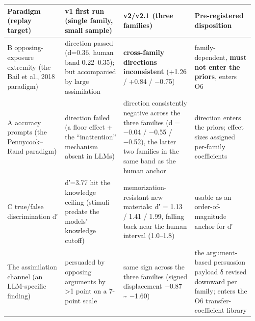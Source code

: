 \documentclass[
  11pt]{article}
\begin{document}
\begin{longtable}[]{@{}
  >{\raggedright\arraybackslash}p{}
  >{\raggedright\arraybackslash}p{}
  >{\raggedright\arraybackslash}p{}
  >{\raggedright\arraybackslash}p{}@{}}
\toprule\noalign{}
\begin{minipage}[b]{\linewidth}\raggedright
Paradigm (replay target)
\end{minipage} & \begin{minipage}[b]{\linewidth}\raggedright
v1 first run (single family, small sample)
\end{minipage} & \begin{minipage}[b]{\linewidth}\raggedright
v2/v2.1 (three families)
\end{minipage} & \begin{minipage}[b]{\linewidth}\raggedright
Pre-registered disposition
\end{minipage} \\
\midrule\noalign{}
\endhead
\bottomrule\noalign{}
\endlastfoot
B opposing-exposure extremity (the Bail et al., 2018 paradigm) &
direction passed (d=0.36, human band 0.22--0.35); but accompanied by
large assimilation & \textbf{cross-family directions inconsistent}
(+1.26 / +0.84 / −0.75) & family-dependent, \textbf{must not enter the
priors}, enters O6 \\
A accuracy prompts (the Pennycook--Rand paradigm) & direction failed (a
floor effect + the ``inattention'' mechanism absent in LLMs) & direction
consistently negative across the three families (d = −0.04 / −0.55 /
−0.52), the latter two families in the same band as the human anchor &
direction enters the priors; effect sizes assigned per-family
coefficients \\
C true/false discrimination d′ & d′=3.77 hit the knowledge ceiling
(stimuli predate the models' knowledge cutoff) & memorization-resistant
new materials: d′ = 1.13 / 1.41 / 1.99, falling back near the human
interval (1.0--1.8) & usable as an order-of-magnitude anchor for d′ \\
The assimilation channel (an LLM-specific finding) & persuaded by
opposing arguments by \textgreater1 point on a 7-point scale & same sign
across the three families (signed displacement −0.87 \textasciitilde{}
−1.60) & the argument-based persuasion payload δ revised downward per
family; enters the O6 transfer-coefficient library \\
\end{longtable}
\end{document}
